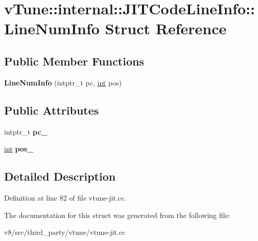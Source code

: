\hypertarget{structvTune_1_1internal_1_1JITCodeLineInfo_1_1LineNumInfo}{}\section{v\+Tune\+:\+:internal\+:\+:J\+I\+T\+Code\+Line\+Info\+:\+:Line\+Num\+Info Struct Reference}
\label{structvTune_1_1internal_1_1JITCodeLineInfo_1_1LineNumInfo}
\subsection*{Public Member Functions}
\begin{DoxyCompactItemize}
\item 
\mbox{\label{structvTune_1_1internal_1_1JITCodeLineInfo_1_1LineNumInfo_a83d2e696265c73ad76b8c597d86c41bf}} 
{\bfseries Line\+Num\+Info} (intptr\+\_\+t pc, \mbox{\hyperlink{classint}{int}} pos)
\end{DoxyCompactItemize}
\subsection*{Public Attributes}
\begin{DoxyCompactItemize}
\item 
\mbox{\label{structvTune_1_1internal_1_1JITCodeLineInfo_1_1LineNumInfo_acfd81b9456b26f913fecd704b98cb048}} 
intptr\+\_\+t {\bfseries pc\+\_\+}
\item 
\mbox{\label{structvTune_1_1internal_1_1JITCodeLineInfo_1_1LineNumInfo_ac756fd703dc80d68800f0dac32db7094}} 
\mbox{\hyperlink{classint}{int}} {\bfseries pos\+\_\+}
\end{DoxyCompactItemize}


\subsection{Detailed Description}


Definition at line 82 of file vtune-\/jit.\+cc.



The documentation for this struct was generated from the following file\+:\begin{DoxyCompactItemize}
\item 
v8/src/third\+\_\+party/vtune/vtune-\/jit.\+cc\end{DoxyCompactItemize}
